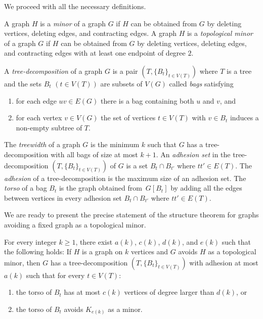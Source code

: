 We proceed with all the necessary definitions.

A graph $H$ is a \emph{minor} of a graph $G$ if $H$ can be obtained from $G$ by 
deleting vertices, deleting edges, and contracting edges. 
A graph $H$ is a \emph{topological minor} of a graph $G$ if $H$ can be obtained 
from $G$ by deleting vertices, deleting edges, and contracting edges with 
at least one endpoint of degree $2$.


A \emph{tree-decomposition} of a graph $G$ is a pair $(T,\{B_t\}_{t\in V(T)})$ 
where $T$ is a tree and the sets $B_t$ $(t\in V(T))$ are subsets of $V(G)$ 
called \emph{bags} satisfying
\begin{enumerate}[nosep]
\item for each edge $uv\in E(G)$ there is a bag containing both $u$ and $v$, and
\item for each vertex $v\in V(G)$ the set of vertices $t\in V(T)$ with 
$v\in B_t$  induces a non-empty subtree of $T$.
\end{enumerate}
The \emph{treewidth} of a graph $G$ is the minimum $k$ such that
$G$ has a tree-decomposition with all bags of size at most $k+1$.
An \emph{adhesion set} in the tree-decomposition $(T,\{B_t\}_{t\in V(T)})$ 
of $G$ is a set $B_t \cap B_{t'}$ where $tt'\in E(T)$.
The \emph{adhesion} of a tree-decomposition is the maximum size of an adhesion set.
The \emph{torso} of a bag $B_t$ is the graph obtained from~$G[B_t]$ by adding all 
the edges between vertices in every adhesion set $B_t \cap B_{t'}$
where $tt'\in E(T)$.

We are ready to present the precise statement of the structure theorem for graphs avoiding 
a fixed graph as a topological minor.
\begin{theorem}[\cite{GM15}]\label{thm-structure-theorem}
For every integer $k\geq1$, there exist $a(k)$, $c(k)$, 
$d(k)$, and $e(k)$ such that the following holds:
If $H$ is a graph on $k$ vertices and 
$G$ avoids $H$ as a topological minor,
then $G$ has a tree-decomposition $(T,\{B_t\}_{t\in V(T)})$ with 
adhesion at most $a(k)$ such that for every $t\in V(T)$:
\begin{enumerate}[label=\textup{(\roman*)},nosep]
\item the torso of $B_t$ has at most $c(k)$ vertices of degree larger than $d(k)$, or
\item the torso of $B_t$ avoids $K_{e(k)}$ as a minor.
\end{enumerate}
\end{theorem}

